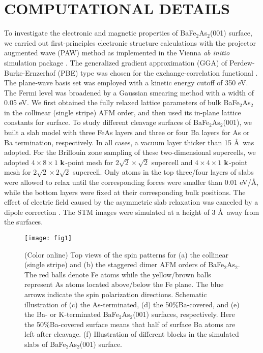 \documentclass[twocolumn,aps,showpacs,prb]{revtex4-1}
\begin{document}
\section{COMPUTATIONAL DETAILS}

To investigate the electronic and magnetic properties of BaFe$_{2}$As$_{2}$(001) surface, we carried out first-principles electronic structure calculations with the projector augmented wave (PAW) method \cite{35PAW} as implemented in the Vienna \textit{ab initio} simulation package \cite{36VASP1,37VASP2}. The generalized gradient approximation (GGA) of Perdew-Burke-Ernzerhof (PBE) type was chosen for the exchange-correlation functional \cite{38PBE}. The plane-wave basis set was employed with a kinetic energy cutoff of 350 eV. The Fermi level was broadened by a Gaussian smearing method with a width of 0.05 eV. We first obtained the fully relaxed lattice parameters of bulk BaFe$_{2}$As$_{2}$ in the collinear (single stripe) AFM order, and then used its in-plane lattice constants for surface. To study different cleavage surfaces of BaFe$_{2}$As$_{2}$(001), we built a slab model with three FeAs layers and three or four Ba layers for As or Ba termination, respectively. In all cases, a vacuum layer thicker than 15 \AA\ was adopted. For the Brillouin zone sampling of these two-dimensional supercells, we adopted $4\times8\times1$ ${\bf k}$-point mesh for $2\sqrt{2}\times\sqrt{2}$ supercell and $4\times4\times1$ ${\bf k}$-point mesh for $2\sqrt{2}\times2\sqrt{2}$ supercell. Only atoms in the top three/four layers of slabs were allowed to relax until the corresponding forces were smaller than 0.01 eV/\AA, while the bottom layers were fixed at their corresponding bulk positions. The effect of electric field caused by the asymmetric slab relaxation was canceled by a dipole correction \cite{39JNeugebauer(1992)PRB}. The STM images were simulated at a height of 3 \AA\ away from the surfaces.

\begin{figure}[!t]
\texttt{[image: fig1]}
\caption{(Color online) Top views of the spin patterns for (a) the collinear (single stripe) and (b) the staggered dimer AFM orders of BaFe$_{2}$As$_{2}$. The red balls denote Fe atoms while the yellow/brown balls represent As atoms located above/below the Fe plane. The blue arrows indicate the spin polarization directions. Schematic illustration of (c) the As-terminated, (d) the 50\%Ba-covered, and (e) the Ba- or K-terminated BaFe$_{2}$As$_{2}$(001) surfaces, respectively. Here the 50\%Ba-covered surface means that half of surface Ba atoms are left after cleavage. (f) Illustration of different blocks in the simulated slabs of BaFe$_{2}$As$_{2}$(001) surface.}
\label{fig1}
\end{figure}
\end{document}

